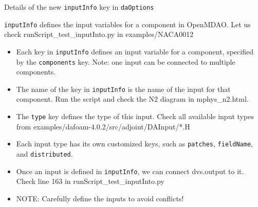 \documentclass{bredelebeamer}
\begin{document}
\begin{frame}{Details of the new \texttt{inputInfo} key in \texttt{daOptions}}

  \texttt{inputInfo} defines the input variables for a component in OpenMDAO. Let us check runScript\_test\_inputInto.py in examples/NACA0012
  
  \begin{itemize}
  
    \item Each key in \texttt{inputInfo} defines an input variable for a component, specified by the \texttt{components} key. Note: one input can be connected to multiple components.
    \item The name of the key in \texttt{inputInfo} is the name of the input for that component. Run the script and check the N2 diagram in mphys\_n2.html.
    \item The \texttt{type} key defines the type of this input. Check all available input types from examples/dafoam-4.0.2/src/adjoint/DAInput/*.H
    \item Each input type has its own customized keys, such as \texttt{patches}, \texttt{fieldName}, and \texttt{distributed}.
    \item Once an input is defined in \texttt{inputInfo}, we can connect dvs.output to it. Check line 163 in runScript\_test\_inputInto.py
    \item NOTE: Carefully define the inputs to avoid conflicts!
  \end{itemize}
  
  \end{frame}
\end{document}
